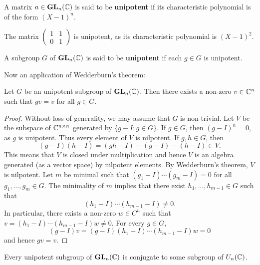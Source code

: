 \begin{definition}
    A matrix $a\in\mathbf{GL}_n(\mathbb{C})$ is said to be \textbf{unipotent} 
    if its characteristic polynomial is of the form 
    $(X-1)^n$. 
\end{definition}

The matrix $\begin{pmatrix}1&1\\0&1\end{pmatrix}$ is unipotent, 
as its characteristic polynomial is $(X-1)^2$. 

\begin{definition}
    A subgroup $G$ of $\mathbf{GL}_n(\mathbb{C})$ is said to be \textbf{unipotent} if
    each $g\in G$ is unipotent. 
\end{definition}

Now an application of Wedderburn's theorem:

\begin{proposition}
\label{pro:unipotent}
    Let $G$ be an unipotent subgroup of $\mathbf{GL}_n(\mathbb{C})$. 
    Then there exists a non-zero 
    $v\in\mathbb{C}^{n}$ such that $gv=v$ for all $g\in G$. 
\end{proposition}

\begin{proof}
    Without loss of generality, we may assume that $G$ is non-trivial. 
    Let $V$ be the subspace of $\mathbb{C}^{n\times n}$ 
    generated by $\{g-I:g\in G\}$. If $g\in G$, then 
    $(g-I)^n=0$, as $g$ is unipotent. Thus
    every element of $V$ is nilpotent. If $g,h\in G$, 
    then 
    \[
    (g-I)(h-I)=(gh-I)-(g-I)-(h-I)\in V.
    \]
    This means that $V$ is closed under multiplication and
    hence $V$ is an algebra generated (as a vector space)
    by nilpotent elements. By Wedderburn's theorem, 
    $V$ is nilpotent. Let $m$ be minimal 
    such that 
    $(g_1-I)\cdots (g_m-I)=0$ 
    for all $g_1,\dots,g_m\in G$. The minimality of $m$ implies that  
    there exist $h_1,\dots,h_{m-1}\in G$ such that 
    \[
    (h_1-I)\cdots (h_{m-1}-I)\ne 0.
    \]
    In particular, there exists a non-zero 
    $w\in C^{n}$ such that 
    $v=(h_1-I)\cdots (h_{m-1}-I)w\ne 0$. For every 
    $g\in G$, 
    \[
    (g-I)v=(g-I)(h_1-I)\cdots (h_{m-1}-I)w=0
    \]
    and hence $gv=v$. 
\end{proof}

\begin{theorem}[Kolchin]
\label{thm:Kolchin}
Every unipotent subgroup of $\mathbf{GL}_n(\mathbb{C})$ is conjugate
to some subgroup of $U_n(\mathbb{C})$. 
\end{theorem}

